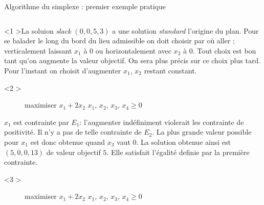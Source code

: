 \documentclass[aspectratio = 169]{beamer}
\begin{document}
\begin{frame}{Algorithme du simplexe : premier exemple pratique}
    \begin{columns}
        \begin{column}{.5\textwidth}
          \begin{onlyenv}<1
            >La soluion \textit{slack} $(0, 0, 5, 3)$
            a une solution \textit{standard} l'origine du plan. Pour
            se balader le long du bord du lieu admissible on doit
            choisir par où aller ; verticalement laissant $x_1$ à $0$
            ou horizontalement avec $x_2$ à $0$. Tout choix est bon
            tant qu'on augmente la valeur objectif. On sera plus
            précis sur ce choix plus tard. Pour l'instant on choisit
            d'augmenter $x_1$, $x_2$ restant constant.
            \end{onlyenv}
            \begin{onlyenv}<2
              >
              \begin{figure}
                \small{
                  \begin{linearProg}{
                      maximiser
                    }{
                      $x_1 + 2x_2$
                    }{
                    }{
                      $x_1$, $x_2$, $x_3$, $x_4 \geq 0$
                    }
                  \end{linearProg}
                }
              \end{figure}
              $x_1$ est contrainte par $E_1$: l'augmenter indéfiniment
              violerait les contrainte de positivité. Il n'y a pas de
              telle contrainte de $E_2$. La plus grande valeur
              possible pour $x_1$ est donc obtenue quand $x_3$ vaut
              $0$. La solution obtenue ainsi est $(5, 0, 0, 13)$ de
              valeur objectif $5$. Elle satisfait l'égalité definie
              par la première contrainte.
            \end{onlyenv}
            \begin{onlyenv}<3
              >
              \begin{figure}
                \small{
                  \begin{linearProg}{
                      maximiser
                    }{
                      $x_1 + 2x_2$
                    }{
                    }{
                      $x_1$, $x_2$, $x_3$, $x_4 \geq 0$
                    }

\end{linearProg}}
\end{figure}
\end{onlyenv}
\end{column}
\end{columns}
\end{frame}
\end{document}
